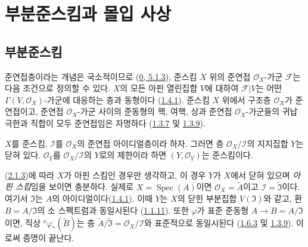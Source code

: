 \section{부분준스킴과 몰입 사상}
\label{section:I.4-ko}

\subsection{부분준스킴}
\label{subsection:I.4.1-ko}

\begin{env}[4.1.1]
\label{I.4.1.1-ko}
준연접층이라는 개념은 국소적이므로
(\hyperref[0.5.1.3-ko]{0, 5.1.3}), 준스킴 $X$ 위의 준연접
$\mathscr{O}_X$-가군 $\mathscr{F}$는 다음 조건으로 정의할 수 있다.
$X$의 모든 아핀 열린집합 $V$에 대하여 $\mathscr{F}|V$는 어떤
$\Gamma(V,\mathscr{O}_X)$-가군에 대응하는 층과 동형이다
(\hyperref[I.1.4.1-ko]{1.4.1}). 준스킴 $X$ 위에서 구조층
$\mathscr{O}_X$가 준연접이고, 준연접 $\mathscr{O}_X$-가군 사이의
준동형의 핵, 여핵, 상과 준연접 $\mathscr{O}_X$-가군들의 귀납극한과
직합이 모두 준연접임은 자명하다
(\hyperref[I.1.3.7-ko]{1.3.7} 및
\hyperref[I.1.3.9-ko]{1.3.9}).
\end{env}

\begin{proposition}[4.1.2]
\label{I.4.1.2-ko}
$X$를 준스킴, $\mathscr{I}$를 $\mathscr{O}_X$의 준연접 아이디얼층이라
하자. 그러면 층 $\mathscr{O}_X/\mathscr{I}$의 지지집합 $Y$는 닫혀
있다. $\mathscr{O}_Y$를 $\mathscr{O}_X/\mathscr{I}$의 $Y$로의
제한이라 하면 $(Y,\mathscr{O}_Y)$는 준스킴이다.
\end{proposition}

(\hyperref[I.2.1.3-ko]{2.1.3})에 따라 $X$가 아핀 스킴인 경우만
생각하고, 이 경우 $Y$가 $X$에서 닫혀 있으며 \emph{아핀 스킴}임을
보이면 충분하다. 실제로 $X=\operatorname{Spec}(A)$이면
$\mathscr{O}_X=\widetilde{A}$이고
$\mathscr{I}=\widetilde{\mathfrak{I}}$이다. 여기서 $\mathfrak{I}$는
$A$의 아이디얼이다(\hyperref[I.1.4.1-ko]{1.4.1}). 이때 $Y$는
$X$의 닫힌 부분집합 $V(\mathfrak{I})$와 같고, 환
$B=A/\mathfrak{I}$의 소 스펙트럼과 동일시된다
(\hyperref[I.1.1.11-ko]{1.1.11}). 또한 $\varphi$가 표준 준동형
$A\to B=A/\mathfrak{I}$이면, 직상
${}^a\varphi_*(\widetilde{B})$는 층
$\widetilde{A}/\widetilde{\mathfrak{I}}
=\mathscr{O}_X/\mathscr{I}$와 표준적으로 동일시된다
(\hyperref[I.1.6.3-ko]{1.6.3} 및
\hyperref[I.1.3.9-ko]{1.3.9}). 이로써 증명이 끝난다.

